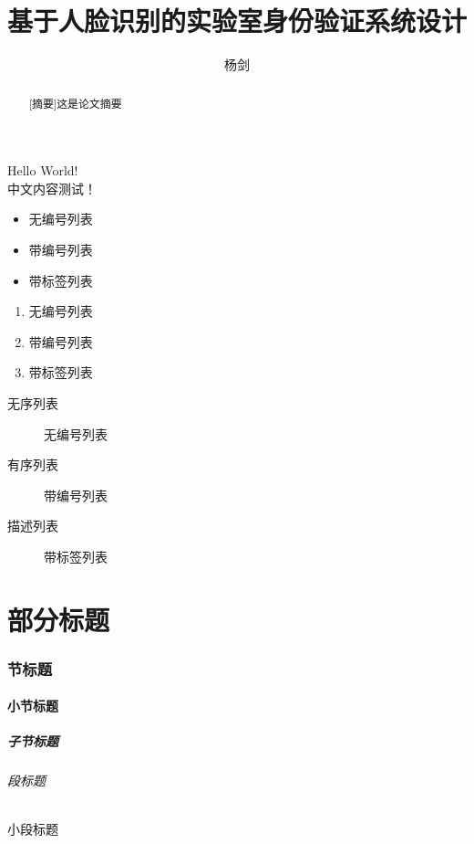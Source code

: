 \documentclass[UTF8]{ctexart}
\begin{document}
    Hello World!
    \\中文内容测试！
    \begin{itemize}
        \item 无编号列表
        \item 带编号列表
        \item 带标签列表
    \end{itemize}
    \begin{enumerate}
        \item 无编号列表
        \item 带编号列表
        \item 带标签列表
    \end{enumerate}
    \begin{description}
        \item[无序列表] 无编号列表
        \item[有序列表] 带编号列表
        \item[描述列表] 带标签列表   
    \end{description}
\clearpage
\title{基于人脸识别的实验室身份验证系统设计}
\author{杨剑}
\maketitle
\begin{abstract}
    [摘要]这是论文摘要
\end{abstract}
\part{部分标题}
\section{节标题}
\subsection{小节标题}
\subsubsection{子节标题}
\paragraph{段标题}
\subparagraph{小段标题}
\end{document}
